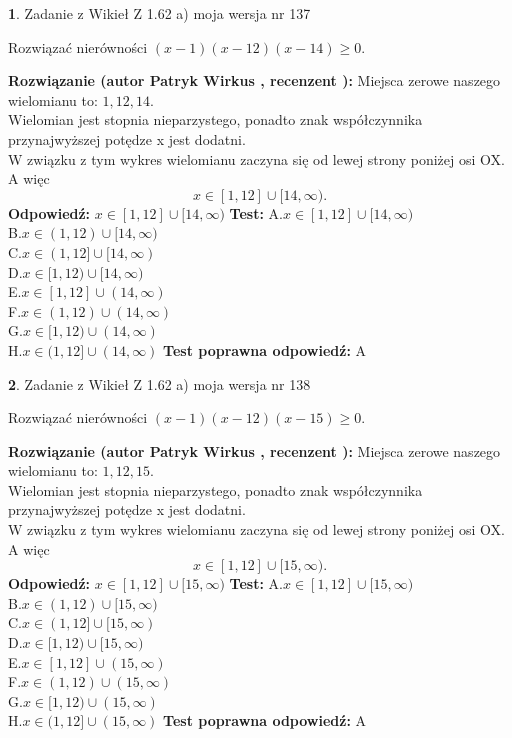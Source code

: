 \documentclass[12pt, a4paper]{article}
\theoremstyle{definition} %
\newtheorem{zad}{}
\newcommand{\zadStart}[1]{\begin{zad}#1\newline}
\newcommand{\zadStop}{\end{zad}}
\newcommand{\rozwStart}[2]{\noindent \textbf{Rozwiązanie (autor #1 , recenzent #2): }\newline}
\newcommand{\rozwStop}{\newline}
\newcommand{\odpStart}{\noindent \textbf{Odpowiedź:}\newline}
\newcommand{\odpStop}{\newline}
\newcommand{\testStart}{\noindent \textbf{Test:}\newline}
\newcommand{\testStop}{\newline}
\newcommand{\kluczStart}{\noindent \textbf{Test poprawna odpowiedź:}\newline}
\newcommand{\kluczStop}{\newline}
\begin{document}
\zadStart{Zadanie z Wikieł Z 1.62 a) moja wersja nr 137}

Rozwiązać nierówności $(x-1)(x-12)(x-14)\ge0$.
\zadStop
\rozwStart{Patryk Wirkus}{}
Miejsca zerowe naszego wielomianu to: $1, 12, 14$.\\
Wielomian jest stopnia nieparzystego, ponadto znak współczynnika przy\linebreak najwyższej potędze x jest dodatni.\\ W związku z tym wykres wielomianu zaczyna się od lewej strony poniżej osi OX. A więc $$x \in [1,12] \cup [14,\infty).$$
\rozwStop
\odpStart
$x \in [1,12] \cup [14,\infty)$
\odpStop
\testStart
A.$x \in [1,12] \cup [14,\infty)$\\
B.$x \in (1,12) \cup [14,\infty)$\\
C.$x \in (1,12] \cup [14,\infty)$\\
D.$x \in [1,12) \cup [14,\infty)$\\
E.$x \in [1,12] \cup (14,\infty)$\\
F.$x \in (1,12) \cup (14,\infty)$\\
G.$x \in [1,12) \cup (14,\infty)$\\
H.$x \in (1,12] \cup (14,\infty)$
\testStop
\kluczStart
A
\kluczStop



\zadStart{Zadanie z Wikieł Z 1.62 a) moja wersja nr 138}

Rozwiązać nierówności $(x-1)(x-12)(x-15)\ge0$.
\zadStop
\rozwStart{Patryk Wirkus}{}
Miejsca zerowe naszego wielomianu to: $1, 12, 15$.\\
Wielomian jest stopnia nieparzystego, ponadto znak współczynnika przy\linebreak najwyższej potędze x jest dodatni.\\ W związku z tym wykres wielomianu zaczyna się od lewej strony poniżej osi OX. A więc $$x \in [1,12] \cup [15,\infty).$$
\rozwStop
\odpStart
$x \in [1,12] \cup [15,\infty)$
\odpStop
\testStart
A.$x \in [1,12] \cup [15,\infty)$\\
B.$x \in (1,12) \cup [15,\infty)$\\
C.$x \in (1,12] \cup [15,\infty)$\\
D.$x \in [1,12) \cup [15,\infty)$\\
E.$x \in [1,12] \cup (15,\infty)$\\
F.$x \in (1,12) \cup (15,\infty)$\\
G.$x \in [1,12) \cup (15,\infty)$\\
H.$x \in (1,12] \cup (15,\infty)$
\testStop
\kluczStart
A
\kluczStop
\end{document}

